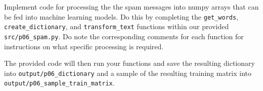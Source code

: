 \item {}
Implement code for processing the the spam messages into numpy arrays that can be fed into machine learning models. Do this by completing the \texttt{get\_words}, \texttt{create\_dictionary}, and \texttt{transform\_text} functions within our provided \texttt{src/p06\_spam.py}. Do note the corresponding comments for each function for instructions on what specific processing is required.

The provided code will then run your functions and save the resulting dictionary into \texttt{output/p06\_dictionary} and a sample of the resulting training matrix into\\
\texttt{output/p06\_sample\_train\_matrix}.

\ifnum{} {
  
} \fi
